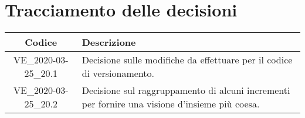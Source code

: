 \section*{Tracciamento delle decisioni}

\begin{center}
	\begin{longtable}{|c|p{12.25cm}|}
	\hline
	\rowcolor{lighter-grayer}
	\textbf{Codice} & \textbf{Descrizione} \\
	\hline
	\endfirsthead

	\hline
	VE\_2020-03-25\_20.1 & Decisione sulle modifiche da effettuare per il codice di versionamento. \\
	\hline
	VE\_2020-03-25\_20.2 & Decisione sul raggruppamento di alcuni incrementi per fornire una visione d'insieme più coesa. \\
	\hline

	\end{longtable}
\end{center}
